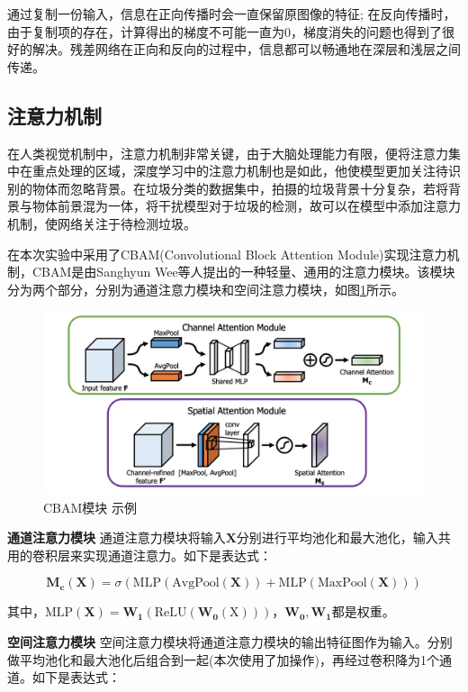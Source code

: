 \documentclass[a4paper]{article}
\begin{document}
\begin{CJK*}{UTF8}{gbsn}
通过复制一份输入，信息在正向传播时会一直保留原图像的特征; 在反向传播时，由于复制项的存在，计算得出的梯度不可能一直为0，梯度消失的问题也得到了很好的解决。残差网络在正向和反向的过程中，信息都可以畅通地在深层和浅层之间传递。

\subsection{注意力机制}

在人类视觉机制中，注意力机制非常关键，由于大脑处理能力有限，便将注意力集中在重点处理的区域，深度学习中的注意力机制也是如此，他使模型更加关注待识别的物体而忽略背景。在垃圾分类的数据集中，拍摄的垃圾背景十分复杂，若将背景与物体前景混为一体，将干扰模型对于垃圾的检测，故可以在模型中添加注意力机制，使网络关注于待检测垃圾。

在本次实验中采用了CBAM(Convolutional Block Attention Module)实现注意力机制，CBAM是由Sanghyun Wee等人\cite{woo2018cbam}提出的一种轻量、通用的注意力模块。该模块分为两个部分，分别为通道注意力模块和空间注意力模块，如图\ref{fig:cbam}所示。

\begin{figure}[h!]
\centering
\includegraphics[scale=0.3]{cbam.jpg}
\caption{CBAM模块 示例}
\label{fig:cbam}
\end{figure}

\textbf{通道注意力模块} 通道注意力模块将输入$\mathbf{X}$分别进行平均池化和最大池化，输入共用的卷积层来实现通道注意力。如下是表达式：

$$\mathbf{M_c}(\mathbf{X})=\sigma(\mathrm{MLP}(\mathrm{AvgPool}(\mathbf{X}))+\mathrm{MLP}(\mathrm{MaxPool(\mathbf{X})}))$$

其中，$\mathrm{MLP}(\mathbf{X})=\mathbf{W_1}(\mathrm{ReLU}(\mathbf{W_0}(\mathrm{X})))$，$\mathbf{W_0},\mathbf{W_1}$都是权重。

\textbf{空间注意力模块} 空间注意力模块将通道注意力模块的输出特征图作为输入。分别做平均池化和最大池化后组合到一起(本次使用了加操作)，再经过卷积降为1个通道。如下是表达式：


\end{CJK*}
\end{document}
